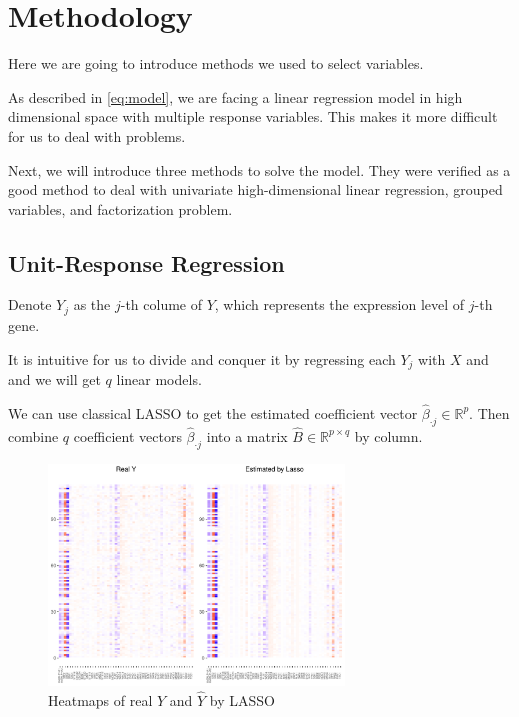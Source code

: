 \section{Methodology}\label{sec:method}

Here we are going to introduce methods we used to select variables. 

As described in \eqref{eq:model}, we are facing a linear regression model in high dimensional space with multiple response variables. 
This makes it more difficult for us to deal with problems. 

Next, we will introduce three methods to solve the model. 
They were verified as a good method to deal with univariate high-dimensional linear regression, grouped variables, and factorization problem. 

\subsection{Unit-Response Regression}

Denote $Y_j$ as the $j$-th colume of $Y$, which represents the expression level of $j$-th gene. 

It is intuitive for us to divide and conquer it by regressing each $Y_j$ with $X$ and and we will get $q$ linear models. 

We can use classical LASSO \citep{tibshirani1996regression} to get the estimated coefficient vector $\hat{\beta}_{\cdot j} \in \mathbb{R}^{p}$. 
Then combine $q$ coefficient vectors $\hat{\beta}_{\cdot j}$ into a matrix $\widehat{B}\in\mathbb{R}^{p\times q}$ by column. 

\begin{figure}[ht]
    \centering
    \includegraphics[width=0.7\textwidth]{./figs/heatmap_lasso.pdf}
    \caption{Heatmaps of real $Y$ and $\hat{Y}$ by LASSO}
    \label{fig:heatmaplasso}
\end{figure}

